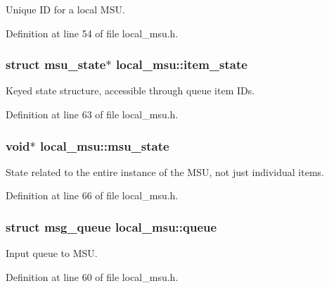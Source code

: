 Unique I\-D for a local M\-S\-U. 



Definition at line 54 of file local\-\_\-msu.\-h.

\hypertarget{structlocal__msu_a1f36b6678f46ffb35e60a8fd4a99a862}{
\subsubsection[{item\-\_\-state}]{\setlength{\rightskip}{0pt plus 5cm}struct {\bf msu\-\_\-state}$\ast$ local\-\_\-msu\-::item\-\_\-state}}\label{structlocal__msu_a1f36b6678f46ffb35e60a8fd4a99a862}


Keyed state structure, accessible through queue item I\-Ds. 



Definition at line 63 of file local\-\_\-msu.\-h.

\hypertarget{structlocal__msu_a4b540cc46b0cc35e4e7684f2d6af7c41}{
\subsubsection[{msu\-\_\-state}]{\setlength{\rightskip}{0pt plus 5cm}void$\ast$ local\-\_\-msu\-::msu\-\_\-state}}\label{structlocal__msu_a4b540cc46b0cc35e4e7684f2d6af7c41}


State related to the entire instance of the M\-S\-U, not just individual items. 



Definition at line 66 of file local\-\_\-msu.\-h.

\hypertarget{structlocal__msu_a33cb8e5c68228acf60cbf1869ff2a395}{
\subsubsection[{queue}]{\setlength{\rightskip}{0pt plus 5cm}struct {\bf msg\-\_\-queue} local\-\_\-msu\-::queue}}\label{structlocal__msu_a33cb8e5c68228acf60cbf1869ff2a395}


Input queue to M\-S\-U. 



Definition at line 60 of file local\-\_\-msu.\-h.

